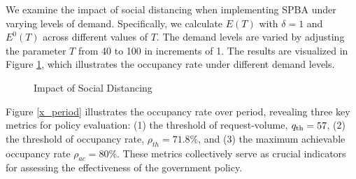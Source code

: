 We examine the impact of social distancing when implementing SPBA under varying levels of demand.  Specifically, we calculate $E(T)$ with $\delta = 1$ and $E^{0}(T)$ across different values of $T$. The demand levels are varied by adjusting the parameter $T$ from 40 to 100 in increments of 1. The results are visualized in Figure \ref{occupancy_rate_demand}, which illustrates the occupancy rate under different demand levels.



\begin{figure}[h]
  \centering
      \caption{Impact of Social Distancing}\label{occupancy_rate_demand}
\end{figure}


Figure \ref{x_period} illustrates the occupancy rate over period, revealing three key metrics for policy evaluation: (1) the threshold of request-volume, ${q}_{\textup{th}} = 57$, (2) the threshold of occupancy rate, $\rho_{th} = 71.8\%$, and (3) the maximum achievable occupancy rate $\rho_{ac} =80\%$. These metrics collectively serve as crucial indicators for assessing the effectiveness of the government policy.


